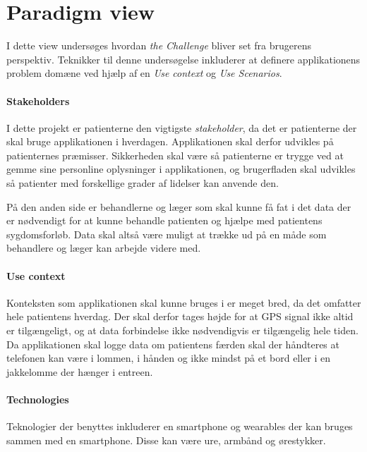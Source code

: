 

\section{Paradigm view}
I dette view undersøges hvordan \textit{the Challenge} bliver set fra brugerens perspektiv.
Teknikker til denne undersøgelse inkluderer at definere applikationens problem domæne ved hjælp af en \textit{Use context} og \textit{Use Scenarios}.

\paragraph{Stakeholders}
I dette projekt er patienterne den vigtigste \textit{stakeholder}, da det er patienterne der skal bruge applikationen i hverdagen.
Applikationen skal derfor udvikles på patienternes præmisser.
Sikkerheden skal være så patienterne er trygge ved at gemme sine personline oplysninger i applikationen, og brugerfladen skal udvikles så patienter med forskellige grader af lidelser kan anvende den.

På den anden side er behandlerne og læger som skal kunne få fat i det data der er nødvendigt for at kunne behandle patienten og hjælpe med patientens sygdomsforløb.
Data skal altså være muligt at trække ud på en måde som behandlere og læger kan arbejde videre med.

\paragraph{Use context}
Konteksten som applikationen skal kunne bruges i er meget bred, da det omfatter hele patientens hverdag.
Der skal derfor tages højde for at GPS signal ikke altid er tilgængeligt, og at data forbindelse ikke nødvendigvis er tilgængelig hele tiden.
Da applikationen skal logge data om patientens færden skal der håndteres at telefonen kan være i lommen, i hånden og ikke mindst på et bord eller i en jakkelomme der hænger i entreen.


\paragraph{Technologies}
Teknologier der benyttes inkluderer en smartphone og wearables der kan bruges sammen med en smartphone.
Disse kan være ure, armbånd og ørestykker.

